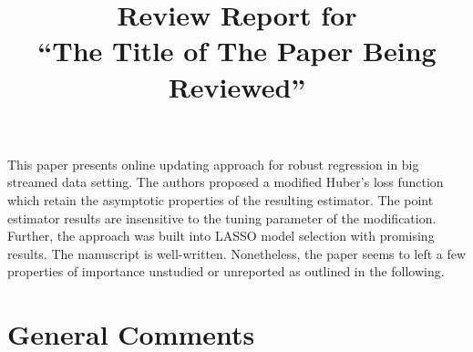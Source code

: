 \documentclass[12pt]{article}
\title{Review Report for\\
  ``The Title of The Paper Being Reviewed''}
\begin{document}
\maketitle


This paper presents online updating approach for robust regression in
big streamed data setting. The authors proposed a modified Huber's loss
function which retain the asymptotic properties of the resulting
estimator. The point estimator results are insensitive to the tuning
parameter of the modification. Further, the approach was built into
LASSO model selection with promising results. The manuscript is
well-written. Nonetheless, the paper seems to left a few properties of
importance unstudied or unreported as outlined in the following.

\section*{General Comments}
\end{document}
